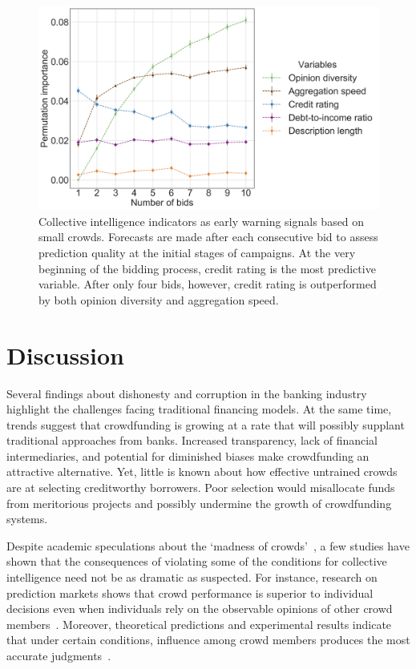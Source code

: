 \documentclass[sigconf]{acmart}
\begin{document}
\begin{figure}
    \centering
    \includegraphics[scale=.232]{samples/figs/permutations_lending.png}
    \caption{Collective intelligence indicators as early warning signals based on small crowds. Forecasts are made after each consecutive bid to assess prediction quality at the initial stages of campaigns. At the very beginning of the bidding process, credit rating is the most predictive variable. After only four bids, however, credit rating is outperformed by both opinion diversity and aggregation speed.}
    \label{fig:permutations}
    \vspace{-2em}
\end{figure}

\section{Discussion}
Several findings about dishonesty and corruption in the banking industry~\cite{Cohn2014,Villeval2014} highlight the challenges facing traditional financing models. At the same time, trends suggest that crowdfunding is growing at a rate that will possibly supplant traditional approaches from banks. Increased transparency, lack of financial intermediaries, and potential for diminished biases make crowdfunding an attractive alternative. Yet, little is known about how effective untrained crowds are at selecting creditworthy borrowers. Poor selection would misallocate funds from meritorious projects and possibly undermine the growth of crowdfunding systems.

Despite academic speculations about the ‘madness of crowds’~\cite{mackay2012extraordinary}, a few studies have shown that the consequences of violating some of the conditions for collective intelligence need not be as dramatic as suspected. For instance, research on prediction markets shows that crowd performance is superior to individual decisions even when individuals rely on the observable opinions of other crowd members~\cite{wolfers2004prediction,arrow2008promise}. Moreover, theoretical predictions and experimental results indicate that under certain conditions, influence among crowd members produces the most accurate judgments~\cite{becker2017network,almaatouq2020adaptive,beckerarxiv}.
\end{document}
